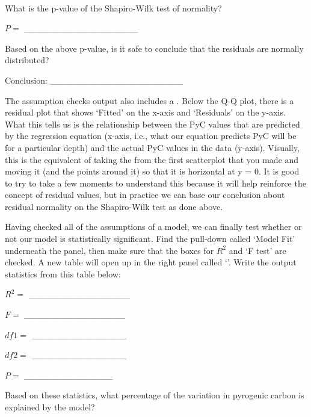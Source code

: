 \documentclass[
  openany]{krantz}
\begin{document}
\begin{verbatim}







\end{verbatim}

What is the p-value of the Shapiro-Wilk test of normality?

\(P =\) \_\_\_\_\_\_\_\_\_\_\_\_\_\_\_\_\_\_

Based on the above p-value, is it safe to conclude that the residuals are normally distributed?

Conclusion: \_\_\_\_\_\_\_\_\_\_\_\_\_\_\_\_\_\_\_\_\_

The assumption checks output also includes a .
Below the Q-Q plot, there is a residual plot that shows `Fitted' on the x-axis and `Residuals' on the y-axis.
What this tells us is the relationship between the PyC values that are predicted by the regression equation (x-axis, i.e., what our equation predicts PyC will be for a particular depth) and the actual PyC values in the data (y-axis).
Visually, this is the equivalent of taking the  from the first scatterplot that you made and moving it (and the points around it) so that it is horizontal at y = 0.
It is good to try to take a few moments to understand this because it will help reinforce the concept of residual values, but in practice we can base our conclusion about residual normality on the Shapiro-Wilk test as done above.

Having checked all of the assumptions of a  model, we can finally test whether or not our model is statistically significant.
Find the pull-down called `Model Fit' underneath the  panel, then make sure that the boxes for \(R^{2}\) and `F test' are checked.
A new table will open up in the right panel called `'.
Write the output statistics from this table below:

\(R^{2} =\) \_\_\_\_\_\_\_\_\_\_\_\_\_\_\_\_

\(F =\) \_\_\_\_\_\_\_\_\_\_\_\_\_\_\_\_

\(df1 =\) \_\_\_\_\_\_\_\_\_\_\_\_\_\_\_

\(df2 =\) \_\_\_\_\_\_\_\_\_\_\_\_\_\_\_

\(P =\) \_\_\_\_\_\_\_\_\_\_\_\_\_\_

Based on these statistics, what percentage of the variation in pyrogenic carbon is explained by the  model?
\end{document}
